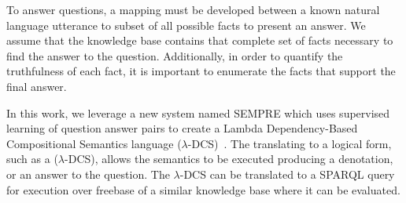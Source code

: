 To answer questions, a mapping must be developed between a known
natural language utterance to subset of all possible facts to present an answer.
We assume that the knowledge base contains that complete set of facts necessary
to find the answer to the question.
Additionally, in order to quantify the truthfulness of each fact, it is
important to enumerate the facts that support the final answer.


In this work, we leverage a new system named SEMPRE which uses supervised
learning of question answer pairs to create a Lambda Dependency-Based
Compositional Semantics language (\(\lambda\)-DCS)~\cite{berant2013semantic}.
The translating to a logical form, such as a (\(\lambda\)-DCS), allows the
semantics to be executed producing a denotation, or an answer to the question.
The \(\lambda\)-DCS can be translated to a SPARQL query for execution over 
freebase of a similar knowledge base where it can be evaluated.




